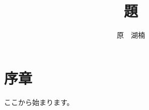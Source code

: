 \documentclass[12pt,a4paper,dvipdfmx]{jsarticle}
\title{題}
\author{原　湖楠}
\begin{document}
 
\maketitle{} 
\section{序章} ここから始まります。 
\end{document}
